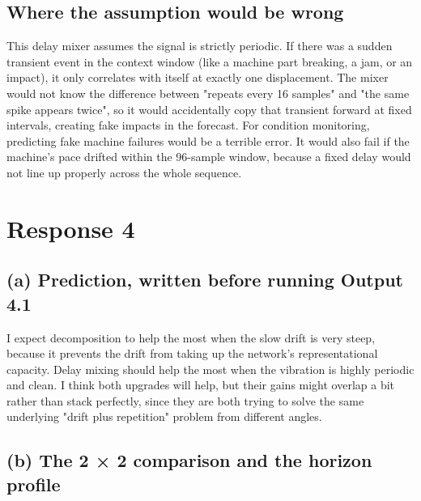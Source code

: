 \documentclass[11pt,letterpaper]{article}
\begin{document}
\subsection*{Where the assumption would be wrong}

This delay mixer assumes the signal is strictly periodic. If there was a sudden transient event in the context window (like a machine part breaking, a jam, or an impact), it only correlates with itself at exactly one displacement. The mixer would not know the difference between "repeats every 16 samples" and "the same spike appears twice", so it would accidentally copy that transient forward at fixed intervals, creating fake impacts in the forecast. For condition monitoring, predicting fake machine failures would be a terrible error. It would also fail if the machine's pace drifted within the 96-sample window, because a fixed delay would not line up properly across the whole sequence.


\vspace{10pt}


\section*{Response 4}

\subsection*{(a) Prediction, written before running Output 4.1}

I expect decomposition to help the most when the slow drift is very steep, because it prevents the drift from taking up the network's representational capacity. Delay mixing should help the most when the vibration is highly periodic and clean. I think both upgrades will help, but their gains might overlap a bit rather than stack perfectly, since they are both trying to solve the same underlying "drift plus repetition" problem from different angles.

\subsection*{(b) The 2 × 2 comparison and the horizon profile}
\end{document}
